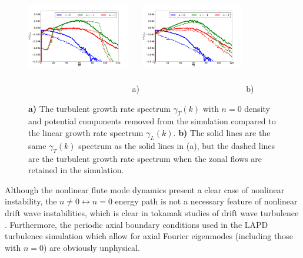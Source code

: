 \documentclass[showpacs,preprintnumbers,amsmath,amssymb,superscriptaddress]{revtex4}
\begin{document}
\begin{figure}
\includegraphics[width=0.40\textwidth,height=50mm]{non0_vs_lin}~a)
\hfil
\includegraphics[width=0.40\textwidth,height=50mm]{non0_vs_withzf}~b)
\hfil
\caption{\textbf{a)} The turbulent growth rate spectrum $\gamma_T(k)$ with $n=0$ density and potential components removed from the 
simulation compared to the linear growth rate spectrum $\gamma_L(k)$.
\textbf{b)} The solid lines are the same $\gamma_T(k)$ spectrum as the solid lines in (a), but the dashed lines are the turbulent growth rate spectrum when the zonal flows are retained
in the simulation.}
\label{gamma_no_n0_figs}
\end{figure}


Although the nonlinear flute mode dynamics present a clear case of nonlinear instability, the $n \ne 0 \leftrightarrow n=0$ energy path is not a necessary feature of nonlinear drift wave
instabilities, which is clear in tokamak studies of drift wave turbulence \cite{zeiler1996,zeiler1997,scott2002,scott2003,scott2005}. Furthermore, the periodic axial boundary conditions
used in the LAPD turbulence simulation which allow for axial Fourier eigenmodes (including those with $n=0$) are obviously unphysical. 
\end{document}
